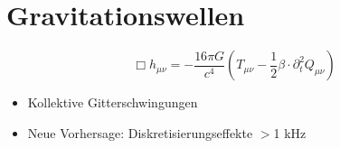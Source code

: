 \section{Gravitationswellen}
\[ \Box h_{\mu\nu} = -\frac{16\pi G}{c^4} \left( T_{\mu\nu} - \frac{1}{2} \beta \cdot \partial_t^2 Q_{\mu\nu} \right) \]

\begin{itemize}
    \item Kollektive Gitterschwingungen
    \item Neue Vorhersage: Diskretisierungseffekte $>$1 kHz
\end{itemize}